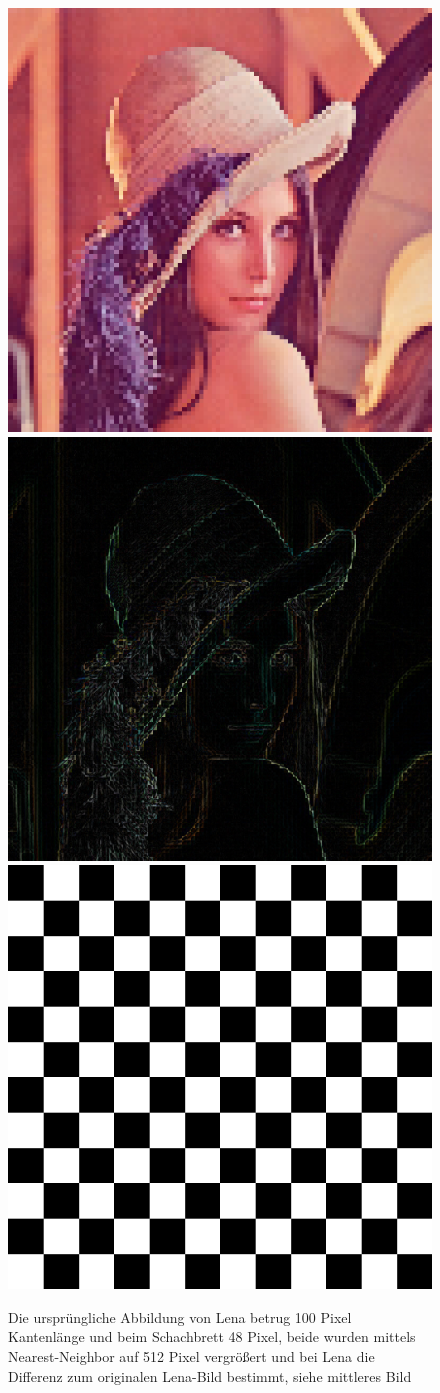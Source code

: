 \begin{figure}
	\centering
	\includegraphics[width=0.2\linewidth]{img/lena100_NN}
	\includegraphics[width=0.2\linewidth]{img/lena100_NN_differenz}
	\includegraphics[width=0.2\linewidth]{img/Schachbrett_NN}
	\caption{Die ursprüngliche Abbildung von Lena betrug 100 Pixel Kantenlänge und beim Schachbrett 48 Pixel, beide wurden mittels Nearest-Neighbor auf 512 Pixel vergrößert und bei Lena die Differenz zum originalen Lena-Bild bestimmt, siehe mittleres Bild}
	\label{img_NN}
\end{figure}
